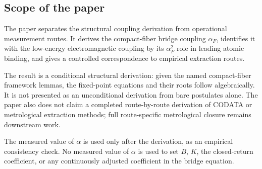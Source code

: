 \subsection{Scope of the paper}

The paper separates the structural coupling derivation from operational
measurement routes. It derives the compact-fiber bridge coupling
\(\alpha_F\), identifies it with the low-energy electromagnetic coupling
by its \(\alpha_F^2\) role in leading atomic binding, and gives a
controlled correspondence to empirical extraction routes.

The result is a conditional structural derivation: given the named
compact-fiber framework lemmas, the fixed-point equations and their roots
follow algebraically. It is not presented as an unconditional derivation
from bare postulates alone. The paper also does not claim a completed
route-by-route derivation of CODATA or metrological extraction methods;
full route-specific metrological closure remains downstream work.

The measured value of \(\alpha\) is used only after the derivation, as
an empirical consistency check. No measured value of \(\alpha\) is used
to set \(B\), \(K\), the closed-return coefficient, or any continuously
adjusted coefficient in the bridge equation.